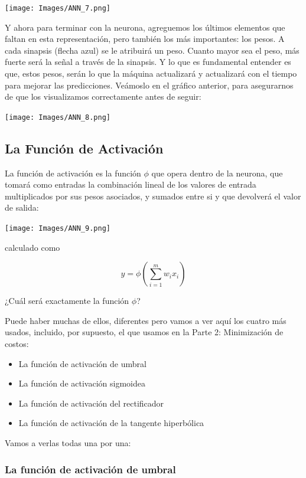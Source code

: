 \documentclass[
]{book}
\providecommand{\tightlist}{%
  \setlength{\itemsep}{0pt}\setlength{\parskip}{0pt}}
\begin{document}
\texttt{[image: Images/ANN\_7.png]}

Y ahora para terminar con la neurona, agreguemos los últimos elementos que faltan en esta representación, pero también los más importantes: los pesos. A cada sinapsis (flecha azul) se le atribuirá un peso. Cuanto mayor sea el peso, más fuerte será la señal a través de la sinapsis. Y lo que es fundamental entender es que, estos pesos, serán lo que la máquina actualizará y actualizará con el tiempo para mejorar las predicciones. Veámoslo en el gráfico anterior, para asegurarnos de que los visualizamos correctamente antes de seguir:

\texttt{[image: Images/ANN\_8.png]}

\hypertarget{la-funciuxf3n-de-activaciuxf3n}{%
\subsection{La Función de Activación}\label{la-funciuxf3n-de-activaciuxf3n}}

La función de activación es la función \(\phi\) que opera dentro de la neurona, que tomará como entradas la combinación lineal de los valores de entrada multiplicados por sus pesos asociados, y sumados entre si y que devolverá el valor de salida:

\texttt{[image: Images/ANN\_9.png]}

calculado como

\[y = \phi\left( \sum_{i=1}^m w_i x_i \right)\]

¿Cuál será exactamente la función \(\phi\)?

Puede haber muchas de ellos, diferentes pero vamos a ver aquí los cuatro más usados, incluido, por supuesto, el que usamos en la Parte 2: Minimización de costos:

\begin{itemize}
\tightlist
\item
  La función de activación de umbral
\item
  La función de activación sigmoidea
\item
  La función de activación del rectificador
\item
  La función de activación de la tangente hiperbólica
\end{itemize}

Vamos a verlas todas una por una:

\hypertarget{la-funciuxf3n-de-activaciuxf3n-de-umbral}{%
\subsubsection{La función de activación de umbral}\label{la-funciuxf3n-de-activaciuxf3n-de-umbral}}
\end{document}
